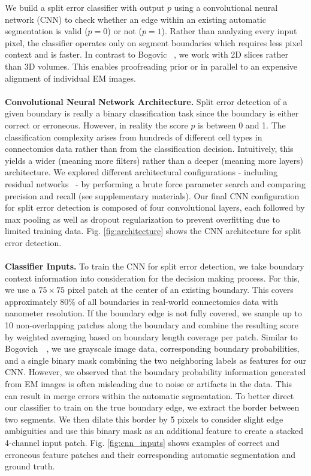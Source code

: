 We build a split error classifier with output $p$ using a convolutional neural network (CNN) to check whether an edge within an existing automatic segmentation is valid ($p=0$) or not ($p=1$). Rather than analyzing every input pixel, the classifier operates only on segment boundaries which requires less pixel context and is faster. In contrast to Bogovic \etal~\cite{BogovicHJ13}, we work with 2D slices rather than 3D volumes. This enables proofreading prior or in parallel to an expensive alignment of individual EM images.
\\~\\
\textbf{Convolutional Neural Network Architecture.} Split error detection of a given boundary is really a binary classification task since the boundary is either correct or erroneous. However, in reality the score $p$ is between 0 and 1. The classification complexity arises from hundreds of different cell types in connectomics data rather than from the classification decision. Intuitively, this yields a wider (meaning more filters) rather than a deeper (meaning more layers) architecture. We explored different architectural configurations - including residual networks~\cite{resnet} - by performing a brute force parameter search and comparing precision and recall (see supplementary materials). Our final CNN configuration for split error detection is composed of four convolutional layers, each followed by max pooling as well as dropout regularization to prevent overfitting due to limited training data. Fig. \ref{fig:architecture} shows the CNN architecture for split error detection.
\\~\\
\textbf{Classifier Inputs.} To train the CNN for split error detection, we take boundary context information into consideration for the decision making process. For this, we use a $75\times75$ pixel patch at the center of an existing boundary. This covers approximately $80\%$ of all boundaries in real-world connectomics data with nanometer resolution. If the boundary edge is not fully covered, we sample up to 10 non-overlapping patches along the boundary and combine the resulting score by weighted averaging based on boundary length coverage per patch. 
Similar to Bogovich~\etal~\cite{BogovicHJ13}, we use grayscale image data, corresponding boundary probabilities, and a single binary mask combining the two neighboring labels as features for our CNN. However, we observed that the boundary probability information generated from EM images is often misleading due to noise or artifacts in the data. This can result in merge errors within the automatic segmentation. To better direct our classifier to train on the true boundary edge, we extract the border between two segments. We then dilate this border by 5 pixels to consider slight edge ambiguities and use this binary mask as an additional feature to create a stacked 4-channel input patch. Fig. \ref{fig:cnn_inputs} shows examples of correct and erroneous feature patches and their corresponding automatic segmentation and ground truth. 

